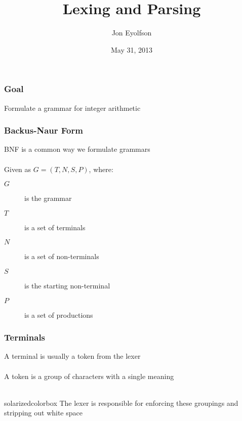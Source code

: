 \documentclass[aspectratio=169]{beamer}
\title{Lexing and Parsing}
\author{Jon Eyolfson}
\date{May 31, 2013}
\institute{University of Waterloo}
\begin{document}
\begin{frame}
  \titlepage
\end{frame}

\begin{frame}
\frametitle{Goal}

Formulate a grammar for integer arithmetic
\end{frame}

\begin{frame}
\frametitle{Backus-Naur Form}

BNF is a common way we formulate grammars\\~\\

Given as $G = (T, N, S, P)$, where:

\begin{description}
  \item[$G$] is the grammar
  \item[$T$] is a set of terminals
  \item[$N$] is a set of non-terminals
  \item[$S$] is the starting non-terminal
  \item[$P$] is a set of productions
\end{description}
\end{frame}

\begin{frame}
\frametitle{Terminals}

A \alert{terminal} is usually a \alert{token} from the \alert{lexer}\\~\\

A \alert{token} is a group of characters with a single meaning\\~\\

\begin{beamercolorbox}[sep=1em]{solarizedcolorbox}
  The \alert{lexer} is responsible for enforcing these groupings and stripping
  out white space
\end{beamercolorbox}

\end{frame}
\end{document}
